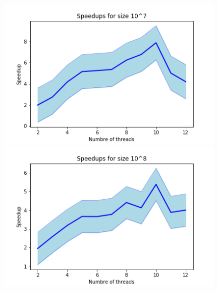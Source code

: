 \documentclass[a4paper,12pt]{article}
\begin{document}
\begin{figure}
        \includegraphics[width = 0.45\linewidth]{Speedups for size 10^7.png}
        \includegraphics[width = 0.55\linewidth]{Speedups for size 10^8.png}
    \end{figure}
\end{document}
